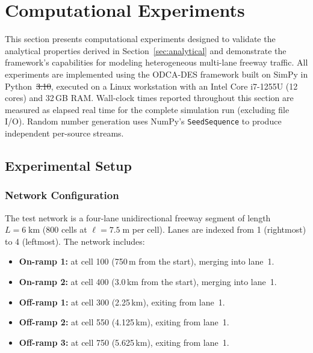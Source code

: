 \documentclass[review,authoryear]{elsarticle}
\providecommand{\DIFaddtex}[1]{{\protect\color{blue}\uwave{#1}}} %
\providecommand{\DIFdeltex}[1]{{\protect\color{red}\sout{#1}}}                      %
\providecommand{\DIFaddbegin}{} %
\providecommand{\DIFaddend}{} %
\providecommand{\DIFdelbegin}{} %
\providecommand{\DIFdelend}{} %
\providecommand{\DIFadd}[1]{\texorpdfstring{\DIFaddtex{#1}}{#1}} %
\providecommand{\DIFdel}[1]{\texorpdfstring{\DIFdeltex{#1}}{}} %
\newcommand{\DIFscaledelfig}{0.5}
\newlength{\DIFdelgraphicswidth} %
\newlength{\DIFdelgraphicsheight} %
\newcommand{\DIFaddincludegraphics}[2][]{{\color{blue}\fbox{\DIFOincludegraphics[#1]{#2}}}} %
\newcommand{\DIFdelincludegraphics}[2][]{%
\sbox{\DIFdelgraphicsbox}{\DIFOincludegraphics[#1]{#2}}%
\settoboxwidth{\DIFdelgraphicswidth}{\DIFdelgraphicsbox} %
\settoboxtotalheight{\DIFdelgraphicsheight}{\DIFdelgraphicsbox} %
\scalebox{\DIFscaledelfig}{%
\parbox[b]{\DIFdelgraphicswidth}{\usebox{\DIFdelgraphicsbox}\\[-\baselineskip] \rule{\DIFdelgraphicswidth}{0em}}\llap{\resizebox{\DIFdelgraphicswidth}{\DIFdelgraphicsheight}{%
\setlength{\unitlength}{\DIFdelgraphicswidth}%
\begin{picture}(1,1)%
\thicklines\linethickness{2pt} %
{\color[rgb]{1,0,0}\put(0,0){\framebox(1,1){}}}%
{\color[rgb]{1,0,0}\put(0,0){\line( 1,1){1}}}%
{\color[rgb]{1,0,0}\put(0,1){\line(1,-1){1}}}%
\end{picture}%
}\hspace*{3pt}}} %
} %
\DeclareRobustCommand{\DIFaddbegin}{\DIFOaddbegin \let\includegraphics\DIFaddincludegraphics} %
\DeclareRobustCommand{\DIFaddend}{\DIFOaddend \let\includegraphics\DIFOincludegraphics} %
\DeclareRobustCommand{\DIFdelbegin}{\DIFOdelbegin \let\includegraphics\DIFdelincludegraphics} %
\DeclareRobustCommand{\DIFdelend}{\DIFOaddend \let\includegraphics\DIFOincludegraphics} %
\begin{document}
\section{Computational Experiments}
\label{sec:experiments}

This section presents computational experiments designed to validate the analytical properties derived in Section~\ref{sec:analytical} and demonstrate the framework's capabilities for modeling heterogeneous multi-lane freeway traffic. All experiments are implemented using the ODCA-DES framework built on SimPy \citep{simpy2023} in Python~\DIFdelbegin \DIFdel{3.10}\DIFdelend \DIFaddbegin \DIFadd{3.13}\DIFaddend , executed on a Linux workstation with an Intel Core i7-1255U (12 cores) and 32\,GB RAM. Wall-clock times reported throughout this section are measured as elapsed real time for the complete simulation run (excluding file I/O). Random number generation uses NumPy's \texttt{SeedSequence} to produce independent per-source streams.

\subsection{Experimental Setup}
\label{sec:exp_setup}

\subsubsection{Network Configuration}

The test network is a four-lane unidirectional freeway segment of length $L = 6\;\text{km}$ (800 cells at $\ell = 7.5\;\text{m}$ per cell). Lanes are indexed from 1 (rightmost) to 4 (leftmost). The network includes:
\begin{itemize}
    \item \textbf{On-ramp 1:} at cell 100 (750\,m from the start), merging into lane~1.
    \item \textbf{On-ramp 2:} at cell 400 (3.0\,km from the start), merging into lane~1.
    \item \textbf{Off-ramp 1:} at cell 300 (2.25\,km), exiting from lane~1.
    \item \textbf{Off-ramp 2:} at cell 550 (4.125\,km), exiting from lane~1.
    \item \textbf{Off-ramp 3:} at cell 750 (5.625\,km), exiting from lane~1.
\end{itemize}
\end{document}
